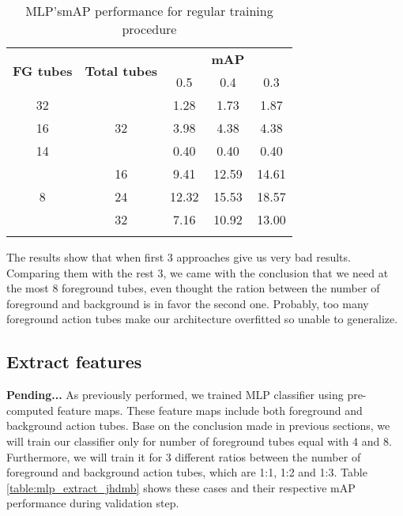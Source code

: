 \begin{center}
  \begin{longtable}{|| c | c || c c c ||}
    \hline
    \multirow{2}{*}{\textbf{FG tubes}} & \multirow{2}{*}{\textbf{Total tubes}} & {} &  \textbf{mAP} & {} \\
    {} & {} & 0.5 & 0.4 & 0.3 \\
    \hline
    32 & \multirow{3}{*}{32} &1.28 & 1.73 & 1.87  \\
    \cline{1-1} \cline{3-5}
    16 & {} & 3.98 & 4.38 & 4.38  \\
    \cline{1-1} \cline{3-5}
    14 & {} & 0.40 & 0.40 & 0.40 \\
    \hline
    \multirow{3}{*}{8} & 16 & 9.41 & 12.59 & 14.61 \\
    \cline{2-5}
    {} & 24 & 12.32 & 15.53 & 18.57 \\
    \cline{2-5}
    {} & 32 & 7.16 & 10.92 & 13.00 \\
    \hline
    \caption{MLP'smAP performance for regular training procedure}
    \label{table:mlp_reg}
  \end{longtable}
\end{center}

The results show that when first 3 approaches give us very bad results. Comparing them with the rest 3, we came with the conclusion that we
need at the most 8 foreground tubes, even thought the ration between the number of foreground and background is in favor the second one.
Probably, too many foreground action tubes make our architecture overfitted so unable to generalize.

\subsection{Extract features}
\textbf{Pending...}
As previously performed, we trained MLP classifier using pre-computed feature maps. These feature maps include both foreground and background
action tubes. Base on the conclusion made in previous sections, we will train our classifier only for number of foreground tubes equal with 4
and 8. Furthermore, we will train it for 3 different ratios between the number of foreground and background action tubes, which are 1:1, 1:2
and 1:3. Table \ref{table:mlp_extract_jhdmb} shows these cases and their respective mAP performance during validation step.

